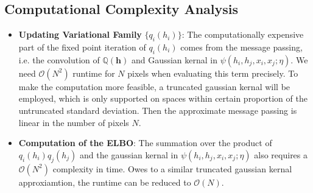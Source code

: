 \documentclass[conference]{IEEEtran}
\newcommand{\QQ}{{\mathbb{Q}}}
\newcommand{\hb}{\mathbf{h}}
\newcommand{\Ocal}{\mathcal{O}}
\begin{document}
\subsection{Computational Complexity Analysis}


\begin{itemize}
\item {\textbf{Updating Variational Family}} $\{q_i(h_i)\}$:
The computationally expensive part of the fixed point iteration of $q_i(h_i)$
comes from the message passing, i.e. the convolution of $\QQ(\hb)$ and
Gaussian kernal in $\psi(h_i, h_j, x_i, x_j; \eta)$. We need $\Ocal(N^2)$
runtime for $N$ pixels when evaluating this term precisely.
To make the computation more feasible, a truncated gaussian kernal will be
employed, which is only supported on spaces within certain proportion of
the untruncated standard deviation. Then the approximate message passing is
linear in the number of pixels $N$.
\item {\textbf{Computation of the ELBO}}: The summation over the product of
$q_i(h_i)q_j(h_j)$ and the gaussian kernal in $\psi(h_i, h_j, x_i, x_j; \eta)$
also requires a $\Ocal(N^2)$ complexity in time.
Owes to a similar truncated gaussian kernal approxiamtion, the runtime can
be reduced to $\Ocal(N)$.
\end{itemize}




\end{document}
